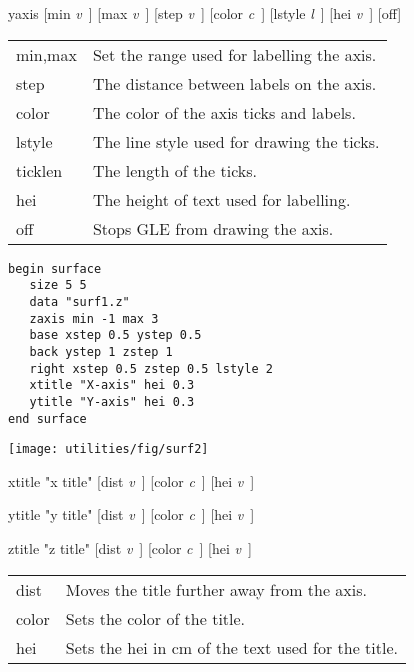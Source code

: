 \begin{commanddescription}
\item[{\sf yaxis [min {\it v}\ ]  [max {\it v}\ ]  [step {\it v}\ ]  [color {\it
c}\ ] [lstyle {\it l}\ ] [hei {\it v}\ ] [off] }]

\begin{tabular}{ll}
min,max & Set the range used for labelling the axis.\\
step    & The distance between labels on the axis.\\
color   & The color of the axis ticks and labels.\\
lstyle  & The line style used for drawing the ticks.\\
ticklen & The length of the ticks.\\
hei     & The height of text used for labelling.\\
off     & Stops GLE from drawing the axis.\\
\end{tabular}

\begin{minipage}[c]{8cm}
\begin{Verbatim}
begin surface
   size 5 5 
   data "surf1.z"
   zaxis min -1 max 3
   base xstep 0.5 ystep 0.5
   back ystep 1 zstep 1 
   right xstep 0.5 zstep 0.5 lstyle 2
   xtitle "X-axis" hei 0.3
   ytitle "Y-axis" hei 0.3
end surface
\end{Verbatim}
\end{minipage}
\hfill
\begin{minipage}[c]{7cm}
\mbox{\texttt{[image: utilities/fig/surf2]}}
\end{minipage}

\item[{\sf xtitle "{\sf x title}"  [dist {\it v}\ ] [color {\it c}\ ] [hei {\it v}\ ]}]

\item[{\sf ytitle "{\sf y title}"  [dist {\it v}\ ] [color {\it c}\ ] [hei {\it v}\ ]}]

\item[{\sf ztitle "{\sf z title}"  [dist {\it v}\ ] [color {\it c}\ ] [hei {\it v}\ ]}]

\begin{tabular}{ll}
dist 	& Moves the title further away from the axis.\\
color	& Sets the color of the title.\\
hei  	& Sets the hei in cm of the text used for the title.\\
\end{tabular}


\end{commanddescription}
